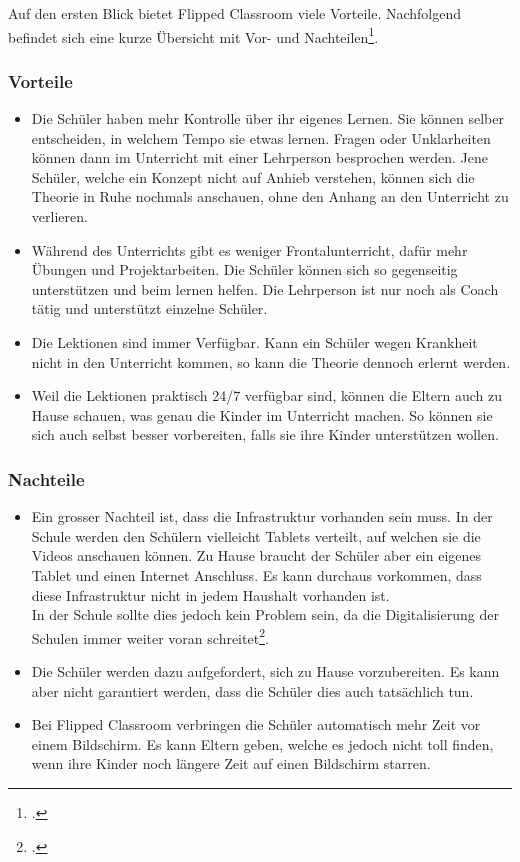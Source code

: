 Auf den ersten Blick bietet Flipped Classroom viele Vorteile. Nachfolgend befindet sich eine kurze Übersicht mit Vor- und Nachteilen\footcite{flipped_classroom_pro_con}.

\newpage
\subsubsection*{Vorteile}
\begin{itemize}
	\item Die Schüler haben mehr Kontrolle über ihr eigenes Lernen. Sie können selber entscheiden, in welchem Tempo sie etwas lernen. Fragen oder Unklarheiten können dann im Unterricht mit einer Lehrperson besprochen werden. Jene Schüler, welche ein Konzept nicht auf Anhieb verstehen, können sich die Theorie in Ruhe nochmals anschauen, ohne den Anhang an den Unterricht zu verlieren.
	\item Während des Unterrichts gibt es weniger Frontalunterricht, dafür mehr Übungen und Projektarbeiten. Die Schüler können sich so gegenseitig unterstützen und beim lernen helfen. Die Lehrperson ist nur noch als Coach tätig und unterstützt einzelne Schüler.
	\item Die Lektionen sind immer Verfügbar. Kann ein Schüler wegen Krankheit nicht in den Unterricht kommen, so kann die Theorie dennoch erlernt werden. 
	\item Weil die Lektionen praktisch 24/7 verfügbar sind, können die Eltern auch zu Hause schauen, was genau die Kinder im Unterricht machen. So können sie sich auch selbst besser vorbereiten, falls sie ihre Kinder unterstützen wollen. 
\end{itemize}

\subsubsection*{Nachteile}
\begin{itemize}
	\item Ein grosser Nachteil ist, dass die Infrastruktur vorhanden sein muss. In der Schule werden den Schülern vielleicht Tablets verteilt, auf welchen sie die Videos anschauen können. Zu Hause braucht der Schüler aber ein eigenes Tablet und einen Internet Anschluss. Es kann durchaus vorkommen, dass diese Infrastruktur nicht in jedem Haushalt vorhanden ist. \\
	In der Schule sollte dies jedoch kein Problem sein, da die Digitalisierung der Schulen immer weiter voran schreitet\footcite{digitale_schule}.
	\item Die Schüler werden dazu aufgefordert, sich zu Hause vorzubereiten. Es kann aber nicht garantiert werden, dass die Schüler dies auch tatsächlich tun.
	\item Bei Flipped Classroom verbringen die Schüler automatisch mehr Zeit vor einem Bildschirm. Es kann Eltern geben, welche es jedoch nicht toll finden, wenn ihre Kinder noch längere Zeit auf einen Bildschirm starren.
\end{itemize}

